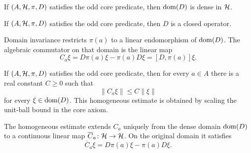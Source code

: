 \begin{lemma}
  \label{lem:dense-domain-dirac}
  \leanok
  If $(A, \mathcal{H}, \pi, D)$ satisfies the odd core predicate, then $\operatorname{dom}(D)$ is dense in $\mathcal{H}$.
\end{lemma}

\begin{lemma}
  \label{lem:isClosed-dirac}
  \leanok
  If $(A, \mathcal{H}, \pi, D)$ satisfies the odd core predicate, then $D$ is a closed operator.
\end{lemma}

\begin{definition}
  \label{def:commutator-on-domain}
  \leanok
  Domain invariance restricts $\pi(a)$ to a linear endomorphism of $\operatorname{dom}(D)$.  The algebraic
  commutator on that domain is the linear map
  \[
    C_a\xi = D\pi(a)\xi-\pi(a)D\xi = [D,\pi(a)]\xi.
  \]
\end{definition}

\begin{lemma}
  \label{lem:exists-comm-bound}
  \leanok
  If $(A, \mathcal{H}, \pi, D)$ satisfies the odd core predicate, then for every $a \in A$ there is
  a real constant $C \geq 0$ such that
  \[
    \|C_a\xi\| \leq C\|\xi\|
  \]
  for every $\xi \in \operatorname{dom}(D)$.  This homogeneous estimate is obtained by scaling the
  unit-ball bound in the core axiom.
\end{lemma}

\begin{definition}
  \label{def:bounded-commutator}
  \leanok
  The homogeneous estimate extends $C_a$ uniquely from the dense domain $\operatorname{dom}(D)$ to a
  continuous linear map $\overline C_a\colon\mathcal{H}\to\mathcal{H}$.  On the original domain it satisfies
  \[
    \overline C_a\xi=D\pi(a)\xi-\pi(a)D\xi.
  \]
\end{definition}

